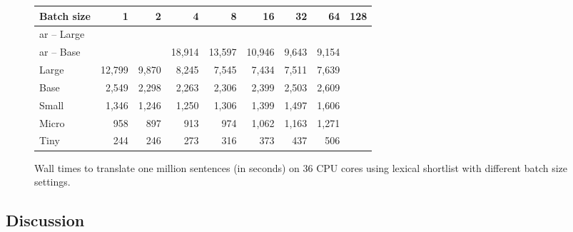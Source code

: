\begin{figure}
  \centering

  
  \vspace{1\baselineskip}

  \begin{tabular}{lrrrrrrrr}
    \toprule
    Batch size & 1 & 2 & 4 & 8 & 16 & 32 & 64 & 128 \\
    \midrule
    \acs{ar} -- Large &&  &  &  &  &  & \\
    \acs{ar} -- Base  &&  & 18,914 & 13,597 & 10,946 & 9,643 & 9,154 \\
    \midrule
    Large & 12,799 & 9,870 & 8,245 & 7,545 & 7,434 & 7,511 & 7,639 \\
    Base  &  2,549 & 2,298 & 2,263 & 2,306 & 2,399 & 2,503 & 2,609 \\
    Small &  1,346 & 1,246 & 1,250 & 1,306 & 1,399 & 1,497 & 1,606 \\
    Micro &    958 &   897 &   913 &   974 & 1,062 & 1,163 & 1,271 \\
    Tiny  &    244 &   246 &   273 &   316 &   373 &   437 &   506 \\
    \bottomrule
  \end{tabular}

  \caption{Wall times to translate one million sentences (in seconds) on 36 CPU
    cores using lexical shortlist with different batch size settings.}%
  \label{fig:throughput:cpu36}
\end{figure}


\subsection{Discussion}%
\label{subsec:results:discussion}


